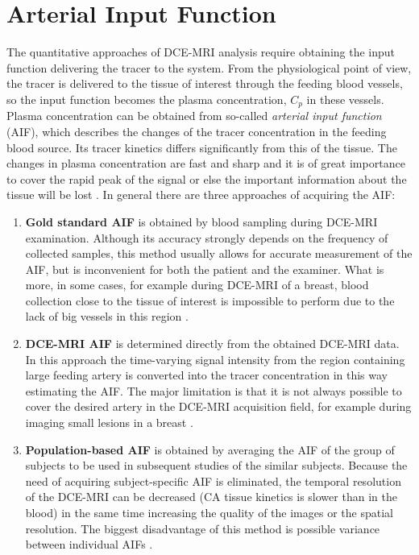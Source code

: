 \section{Arterial Input Function}
The quantitative approaches of DCE-MRI analysis require obtaining the input function delivering the tracer to the system. From the physiological point of view, the tracer is delivered to the tissue of interest through the feeding blood vessels, so the input function becomes the plasma concentration, $C_p$ in these vessels. Plasma concentration can be obtained from so-called \textit{arterial input function} (AIF), which describes the changes of the tracer concentration in the feeding blood source. Its tracer kinetics differs significantly from this of the tissue. The changes in plasma concentration are fast and sharp and it is of great importance to cover the rapid peak of the signal or else the important information about the tissue will be lost \cite{khalifa2014models, jackson2005dynamic, barnes2012practical}.   
In general there are three approaches of acquiring the AIF:
\begin{enumerate}
\item{\textbf{Gold standard AIF}} is obtained by blood sampling during DCE-MRI examination.
Although its accuracy strongly depends on the frequency of collected samples, this method usually allows for accurate measurement of the AIF, but is inconvenient for both the patient and the examiner.
What is more, in some cases, for example during DCE-MRI of a breast, blood collection close to the tissue of interest is impossible to perform due to the lack of big vessels in this region \cite{khalifa2014models, barnes2012practical}. 
\item{\textbf{DCE-MRI AIF}} is determined directly from the obtained DCE-MRI data. In this approach the time-varying signal intensity from the region containing large feeding artery is converted into the tracer concentration in this way estimating the AIF. The major limitation is that it is not always possible to cover the desired artery in the DCE-MRI acquisition field, for example during imaging small lesions in a breast \cite{khalifa2014models}.   
\item{\textbf{Population-based AIF}} is obtained by averaging the AIF of the group of subjects to be used in subsequent studies of the similar subjects. Because the need of acquiring subject-specific AIF is eliminated, the temporal resolution of the DCE-MRI can be decreased (CA tissue kinetics is slower than in the blood) in the same time increasing the quality of the images or the spatial resolution. The biggest disadvantage of this method is possible variance between individual AIFs \cite{jackson2005dynamic}. 
\end{enumerate}



